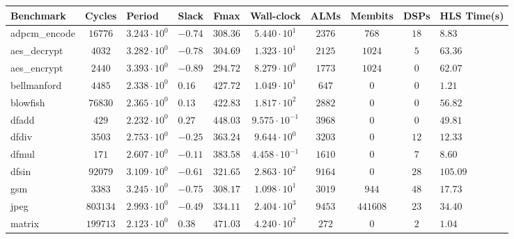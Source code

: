 \begin{tabular}{|l|c|HHc|c|c|c|cH|}
\hline
Benchmark     & Cycles       & Period                 & Slack     & Fmax       & Wall-clock              & ALMs      & Membits    & DSPs    & HLS Time(s) \\
\hline
adpcm\_encode & $ 16776    $ & $ 3.243 \cdot 10^{0} $ & $ -0.74 $ & $ 308.36 $ & $ 5.440 \cdot 10^{1}  $ & $ 2376  $ & $ 768    $ & $ 18  $ & $ 8.83    $ \\
aes\_decrypt  & $ 4032     $ & $ 3.282 \cdot 10^{0} $ & $ -0.78 $ & $ 304.69 $ & $ 1.323 \cdot 10^{1}  $ & $ 2125  $ & $ 1024   $ & $ 5   $ & $ 63.36   $ \\
aes\_encrypt  & $ 2440     $ & $ 3.393 \cdot 10^{0} $ & $ -0.89 $ & $ 294.72 $ & $ 8.279 \cdot 10^{0}  $ & $ 1773  $ & $ 1024   $ & $ 0   $ & $ 62.07   $ \\
bellmanford   & $ 4485     $ & $ 2.338 \cdot 10^{0} $ & $ 0.16  $ & $ 427.72 $ & $ 1.049 \cdot 10^{1}  $ & $ 647   $ & $ 0      $ & $ 0   $ & $ 1.21    $ \\
blowfish      & $ 76830    $ & $ 2.365 \cdot 10^{0} $ & $ 0.13  $ & $ 422.83 $ & $ 1.817 \cdot 10^{2}  $ & $ 2882  $ & $ 0      $ & $ 0   $ & $ 56.82   $ \\
dfadd         & $ 429      $ & $ 2.232 \cdot 10^{0} $ & $ 0.27  $ & $ 448.03 $ & $ 9.575 \cdot 10^{-1} $ & $ 3968  $ & $ 0      $ & $ 0   $ & $ 49.81   $ \\
dfdiv         & $ 3503     $ & $ 2.753 \cdot 10^{0} $ & $ -0.25 $ & $ 363.24 $ & $ 9.644 \cdot 10^{0}  $ & $ 3203  $ & $ 0      $ & $ 12  $ & $ 12.33   $ \\
dfmul         & $ 171      $ & $ 2.607 \cdot 10^{0} $ & $ -0.11 $ & $ 383.58 $ & $ 4.458 \cdot 10^{-1} $ & $ 1610  $ & $ 0      $ & $ 7   $ & $ 8.60    $ \\
dfsin         & $ 92079    $ & $ 3.109 \cdot 10^{0} $ & $ -0.61 $ & $ 321.65 $ & $ 2.863 \cdot 10^{2}  $ & $ 9164  $ & $ 0      $ & $ 28  $ & $ 105.09  $ \\
gsm           & $ 3383     $ & $ 3.245 \cdot 10^{0} $ & $ -0.75 $ & $ 308.17 $ & $ 1.098 \cdot 10^{1}  $ & $ 3019  $ & $ 944    $ & $ 48  $ & $ 17.73   $ \\
jpeg          & $ 803134   $ & $ 2.993 \cdot 10^{0} $ & $ -0.49 $ & $ 334.11 $ & $ 2.404 \cdot 10^{3}  $ & $ 9453  $ & $ 441608 $ & $ 23  $ & $ 34.40   $ \\
matrix        & $ 199713   $ & $ 2.123 \cdot 10^{0} $ & $ 0.38  $ & $ 471.03 $ & $ 4.240 \cdot 10^{2}  $ & $ 272   $ & $ 0      $ & $ 2   $ & $ 1.04    $ \\

\end{tabular}
